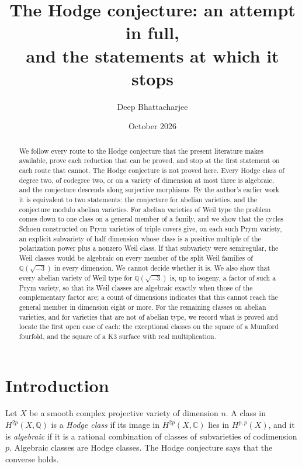 \documentclass[11pt]{amsart}
\title[The Hodge conjecture: an attempt in full]{The Hodge conjecture: an
attempt in full,\\ and the statements at which it stops}
\author{Deep Bhattacharjee}
\date{October 2026}
\theoremstyle{definition}
\theoremstyle{remark}
\newcommand{\QQ}{\mathbb{Q}}
\newcommand{\CC}{\mathbb{C}}
\begin{document}
\begin{abstract}
We follow every route to the Hodge conjecture that the present literature
makes available, prove each reduction that can be proved, and stop at the
first statement on each route that cannot. The Hodge conjecture is not
proved here. Every Hodge class of degree two, of codegree two, or on a
variety of dimension at most three is algebraic, and the conjecture descends
along surjective morphisms. By the author's earlier work it is equivalent to
two statements: the conjecture for abelian varieties, and the conjecture
modulo abelian varieties. For abelian varieties of Weil type the problem comes down to one
class on a general member of a family, and we show that the cycles Schoen
constructed on Prym varieties of triple covers give, on each such Prym
variety, an explicit subvariety of half dimension whose class is a positive
multiple of the polarization power plus a nonzero Weil class. If that
subvariety were semiregular, the Weil classes would be algebraic on every
member of the split Weil families of $\QQ(\sqrt{-3})$ in every dimension. We
cannot decide whether it is. We also show that every abelian variety of Weil
type for $\QQ(\sqrt{-3})$ is, up to isogeny, a factor of such a Prym
variety, so that its Weil classes are algebraic exactly when those of the
complementary factor are; a count of dimensions indicates that this cannot
reach the general member in dimension eight or more. For the remaining
classes on abelian varieties,
and for varieties that are not of abelian type, we record what is proved and
locate the first open case of each: the exceptional classes on the square of
a Mumford fourfold, and the square of a K3 surface with real
multiplication.
\end{abstract}

\maketitle

\section{Introduction}

Let $X$ be a smooth complex projective variety of dimension $n$. A class in
$H^{2p}(X,\QQ)$ is a \emph{Hodge class} if its image in $H^{2p}(X,\CC)$ lies
in $H^{p,p}(X)$, and it is \emph{algebraic} if it is a rational combination of
classes of subvarieties of codimension $p$. Algebraic classes are Hodge
classes. The Hodge conjecture says that the converse holds.
\end{document}

